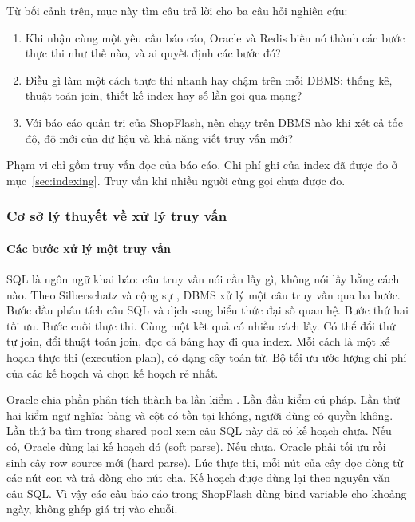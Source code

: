 Từ bối cảnh trên, mục này tìm câu trả lời cho ba câu hỏi nghiên cứu:

\begin{enumerate}[label=(\arabic*),leftmargin=*,itemsep=2pt,topsep=4pt]
\item Khi nhận cùng một yêu cầu báo cáo, Oracle và Redis biến nó thành các bước thực thi như thế nào, và ai quyết định các bước đó?
\item Điều gì làm một cách thực thi nhanh hay chậm trên mỗi DBMS: thống kê, thuật toán join, thiết kế index hay số lần gọi qua mạng?
\item Với báo cáo quản trị của ShopFlash, nên chạy trên DBMS nào khi xét cả tốc độ, độ mới của dữ liệu và khả năng viết truy vấn mới?
\end{enumerate}

Phạm vi chỉ gồm truy vấn đọc của báo cáo. Chi phí ghi của index đã được đo ở mục~\ref{sec:indexing}. Truy vấn khi nhiều người cùng gọi chưa được đo.

\subsubsection{Cơ sở lý thuyết về xử lý truy vấn}\label{sec:q-theory}

\paragraph{Các bước xử lý một truy vấn}\label{sec:q-theory-steps}

SQL là ngôn ngữ khai báo: câu truy vấn nói cần lấy gì, không nói lấy bằng cách nào. Theo Silberschatz và cộng sự \cite{cc-silberschatz2019}, DBMS xử lý một câu truy vấn qua ba bước. Bước đầu phân tích câu SQL và dịch sang biểu thức đại số quan hệ. Bước thứ hai tối ưu. Bước cuối thực thi. Cùng một kết quả có nhiều cách lấy. Có thể đổi thứ tự join, đổi thuật toán join, đọc cả bảng hay đi qua index. Mỗi cách là một kế hoạch thực thi (execution plan), có dạng cây toán tử. Bộ tối ưu ước lượng chi phí của các kế hoạch và chọn kế hoạch rẻ nhất.

Oracle chia phần phân tích thành ba lần kiểm \cite{qOracleSqlProcessing}. Lần đầu kiểm cú pháp. Lần thứ hai kiểm ngữ nghĩa: bảng và cột có tồn tại không, người dùng có quyền không. Lần thứ ba tìm trong shared pool xem câu SQL này đã có kế hoạch chưa. Nếu có, Oracle dùng lại kế hoạch đó (soft parse). Nếu chưa, Oracle phải tối ưu rồi sinh cây row source mới (hard parse). Lúc thực thi, mỗi nút của cây đọc dòng từ các nút con và trả dòng cho nút cha. Kế hoạch được dùng lại theo nguyên văn câu SQL. Vì vậy các câu báo cáo trong ShopFlash dùng bind variable cho khoảng ngày, không ghép giá trị vào chuỗi.

